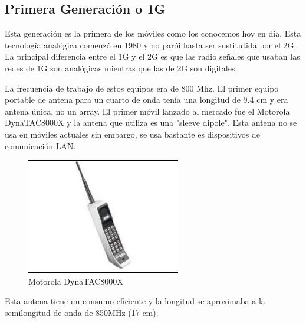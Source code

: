 \documentclass[a4paper,11pt,titlepage]{article}
\begin{document}
\subsection{Primera Generación o 1G}
Esta generación es la primera de los móviles como los conocemos hoy en día. Esta tecnología analógica comenzó en 1980 y no parói hasta ser sustitutida por el 2G. La principal diferencia entre el 1G y el 2G es que las radio señales que usaban las redes de 1G son analógicas mientras que las de 2G son digitales.\par
La frecuencia de trabajo de estos equipos era de 800 Mhz.
El primer equipo portable de antena para un cuarto de onda tenía una longitud de 9.4 cm y era antena única, no un array.
El primer móvil lanzado al mercado fue el Motorola DynaTAC8000X y la antena que utiliza es una "sleeve dipole". Esta antena no se usa en móviles actuales sin embargo, se usa bastante es dispositivos de comunicación LAN.\par
\begin{figure}[H]
\centering
\includegraphics[width=0.6\textwidth]{motorola1}
\caption{Motorola DynaTAC8000X}

\label{motoroladyna}
\end{figure}
Esta antena tiene un consumo eficiente y la longitud se aproximaba a la semilongitud de onda de 850MHz (17 cm).
\end{document}
